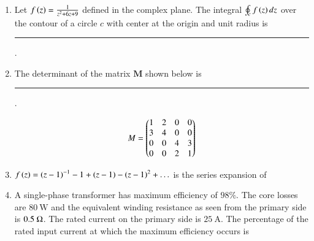 \documentclass[journal,12pt,onecolumn]{IEEEtran}
\theoremstyle{remark}
\begin{document}
\begin{enumerate}
\item Let $f\left(z\right) = \frac{1}{z^2+6z+9}$ defined in the complex plane. 
The integral $\oint_c f\left(z\right)dz$ over the contour of a circle $c$ with center at the origin and unit radius is \rule{1.5cm}{0.4pt}. \par \hfill{}

\item The determinant of the matrix $\textbf{M}$ shown below is \rule{1.5cm}{0.4pt}. \par \hfill{}
$$M = \begin{pmatrix}
1 & 2 & 0 & 0 \\
3 & 4 & 0 & 0 \\
0 & 0 & 4 & 3 \\
0 & 0 & 2 & 1
\end{pmatrix}$$


\item $f\left(z\right) = \left(z-1\right)^{-1} - 1 + \left(z-1\right) - \left(z-1\right)^2 + \ldots$ is the series expansion of   \par \hfill{}
\begin{enumerate}[label=(\Alph*)]
\end{enumerate}

\item A single-phase transformer has maximum efficiency of $98 \%$. The core losses
are $80\ \text{W}$ and the equivalent winding resistance as seen from the primary
side is $0.5\ \ohm$. The rated current on the primary side is $25\ \text{A}$. The percentage
of the rated input current at which the maximum efficiency occurs is \par \hfill{}
\begin{enumerate}[label=(\Alph*)]
\end{enumerate}


\end{enumerate}
\end{document}
